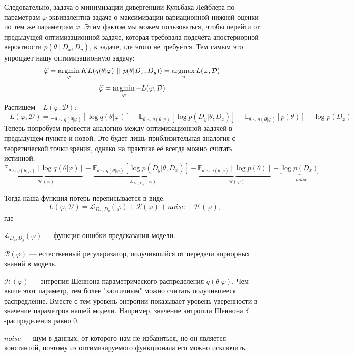 Следовательно, задача о минимизации дивергенции Кульбака-Лейблера по параметрам $\varphi$ эквивалентна задаче о максимизации вариационной нижней оценки по тем же параметрам $\varphi$. Этим
 фактом мы можем пользоваться, чтобы перейти от предыдущей оптимизационной задаче, которая требовала подсчёта апостериорной вероятности $p(\theta\ |\ D_x, D_y)$, к
 задаче, где этого не требуется. Тем самым это упрощает нашу оптимизационную задачу:
$$\widehat{\varphi} = \operatorname*{argmin}_{\varphi} KL(q(\theta | \varphi)\ ||\ p(\theta | D_x, D_y)) = \operatorname*{argmax}_{\varphi} L(\varphi, \mathcal{D})$$
$$\widehat{\varphi} = \operatorname*{argmin}_{\varphi} -L(\varphi, \mathcal{D})$$
Распишем $-L(\varphi, \mathcal{D})$:
$$-L(\varphi, \mathcal{D}) =  \mathbb{E}_{\theta \sim q(\theta | \varphi)} [\log q(\theta | \varphi)] -
\mathbb{E}_{\theta \sim q(\theta | \varphi)} [\log p(D_y | \theta, D_x)] - \mathbb{E}_{\theta \sim q(\theta | \varphi)} [p(\theta)] - \log p(D_x)$$
Теперь попробуем провести аналогию между оптимизационной задачей в предыдущем пункте и новой. Это будет лишь приблизительная аналогия с теоретической точки зрения,
 однако на практике её всегда можно считать истинной:
$$\underbrace{\mathbb{E}_{\theta \sim q(\theta | \varphi)} [\log q(\theta | \varphi)]}_{-\mathcal{H}(\varphi)} -
\underbrace{\mathbb{E}_{\theta \sim q(\theta | \varphi)} [\log p(D_y | \theta, D_x)]}_{-\mathcal{L}_{D_x,D_y}(\varphi)} -
\underbrace{\mathbb{E}_{\theta \sim q(\theta | \varphi)} [\log p(\theta)]}_{-\mathcal{R}(\varphi)} - \underbrace{\log p(D_x)}_{-noise}$$

Тогда наша функция потерь переписывается в виде:
$$-L(\varphi, \mathcal{D}) = \mathcal{L}_{D_x,D_y}(\varphi) + \mathcal{R}(\varphi) + noise - \mathcal{H}(\varphi),$$
где

$\mathcal{L}_{D_x,D_y}(\varphi)$ --- функция ошибки предсказания модели.

$\mathcal{R}(\varphi)$ --- естественный регуляризатор, получившийся от передачи априорных знаний в модель.

$\mathcal{H}(\varphi)$ --- энтропия Шеннона параметрического распределения $q(\theta | \varphi)$. Чем выше этот параметр, тем более "хаотичным" можно считать
 получившееся распредление. Вместе с тем уровень энтропии показывает уровень уверенности в значение параметров нашей модели. Например, значение энтропии Шеннона
 $\delta$-распределения равно 0.

$noise$ --- шум в данных, от которого нам не избавиться, но он является константой, поэтому из оптимизируемого функционала его можно исключить.

